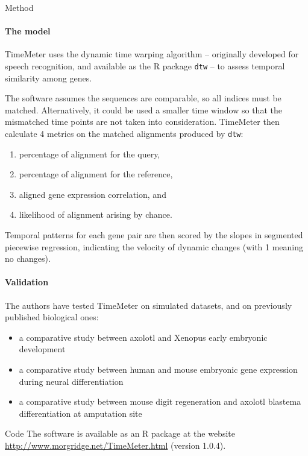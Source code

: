 \documentclass[10pt,a4paper]{article}
\newlength{\templength}
\newenvironment{ann_section}[1]
{\settowidth{\templength}{#1}%
\noindent\textbf{#1}
\hspace{1em}\begin{minipage}[t]{\dimexpr \linewidth-\the\templength-2em}}
{\end{minipage}\par\bigskip}
\begin{document}
\begin{ann_section}{Method}
\paragraph{The model} TimeMeter uses the dynamic time warping algorithm -- originally developed for speech recognition, and available as the R package \texttt{dtw} -- to assess temporal similarity among genes.

The software assumes the sequences are comparable, so all indices must be matched. Alternatively, it could be used a smaller time window so that the mismatched time points are not taken into consideration. TimeMeter then calculate 4 metrics on the matched alignments produced by \texttt{dtw}:
\begin{enumerate}
    \item percentage of alignment for the query,
    \item percentage of alignment for the reference,
    \item aligned gene expression correlation, and
    \item likelihood of alignment arising by chance.
\end{enumerate}

Temporal patterns for each gene pair are then scored by the slopes in segmented piecewise regression, indicating the velocity of dynamic changes (with 1 meaning no changes).
\paragraph{Validation} The authors have tested TimeMeter on simulated datasets, and on previously published biological ones:
\begin{itemize}
    \item a comparative study between axolotl and Xenopus early embryonic development
    \item a comparative study between human and mouse embryonic gene expression during neural differentiation
    \item a comparative study between mouse digit regeneration and axolotl blastema differentiation at amputation site
\end{itemize}
\end{ann_section}

\begin{ann_section}{Code}
The software is available as an R package at the website \url{http://www.morgridge.net/TimeMeter.html} (version 1.0.4).
\end{ann_section}
\end{document}
